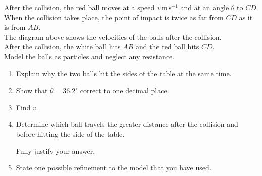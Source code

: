 \documentclass[leqno]{article}
\begin{document}
\begin{enumerate}[
  label=\textbf{\arabic*.},
  leftmargin=*,
  topsep=0pt,
  partopsep=0pt,
  parsep=0pt
]
After the collision, the red ball moves at a speed $v\,\mathrm{m\,s^{-1}}$ and at an angle $\theta$ to $CD$. \\

When the collision takes place, the point of impact is twice as far from $CD$ as it is from $AB$. \\

The diagram above shows the velocities of the balls after the collision. \\

After the collision, the white ball hits $AB$ and the red ball hits $CD$. \\

Model the balls as particles and neglect any resistance. \\

\begin{enumerate}[label=\textbf{(\alph*)}]
  \item Explain why the two balls hit the sides of the table at the same time.  \\
  \item Show that $\theta = 36.2^\circ$ correct to one decimal place.  \\
  \item Find $v$.  \\
  \item Determine which ball travels the greater distance after the collision and before hitting the side of the table.

  Fully justify your answer.  \\
  \item State one possible refinement to the model that you have used.  \\
\end{enumerate}

\newpage

\questionitem

\begin{figure}[H]
    \centering
{}
\end{figure}
\end{enumerate}
\end{document}
